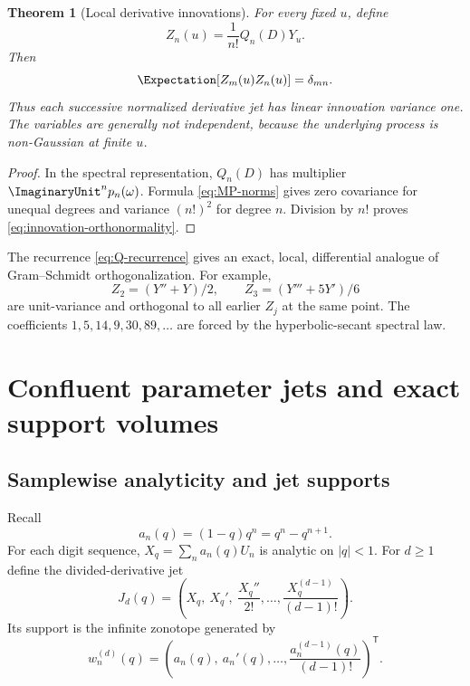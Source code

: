 \documentclass[11pt,a4paper]{article}
\newtheorem{theorem}{Theorem}[section]
\theoremstyle{definition}
\theoremstyle{remark}
\begin{document}
\begin{theorem}[Local derivative innovations]
\label{thm:derivative-innovations}
For every fixed $u$, define
\begin{equation}
  Z_n(u)=\frac1{n!}Q_n(D)Y_u.
  \label{eq:Zn}
\end{equation}
Then
\begin{equation}
  \Expectation[Z_m(u)Z_n(u)]=\delta_{mn}.
  \label{eq:innovation-orthonormality}
\end{equation}
Thus each successive normalized derivative jet has linear innovation variance one.  The variables are generally not independent, because the underlying process is non-Gaussian at finite $u$.
\end{theorem}

\begin{proof}
In the spectral representation, $Q_n(D)$ has multiplier $\ImaginaryUnit^np_n(\omega)$.  Formula \eqref{eq:MP-norms} gives zero covariance for unequal degrees and variance $(n!)^2$ for degree $n$.  Division by $n!$ proves \eqref{eq:innovation-orthonormality}.
\end{proof}

\begin{provedbox}
The recurrence \eqref{eq:Q-recurrence} gives an exact, local, differential analogue of Gram--Schmidt orthogonalization.  For example,
\[
 Z_2=(Y''+Y)/2,
 \qquad
 Z_3=(Y'''+5Y')/6
\]
are unit-variance and orthogonal to all earlier $Z_j$ at the same point.  The coefficients $1,5,14,9,30,89,\ldots$ are forced by the hyperbolic-secant spectral law.
\end{provedbox}

\section{Confluent parameter jets and exact support volumes}
\label{sec:jets}

\subsection{Samplewise analyticity and jet supports}

Recall
\begin{equation}
  a_n(q)=(1-q)q^n=q^n-q^{n+1}.
  \label{eq:anq}
\end{equation}
For each digit sequence, $X_q=\sum_na_n(q)U_n$ is analytic on $|q|<1$.  For $d\ge1$ define the divided-derivative jet
\begin{equation}
  J_d(q)=\left(
   X_q,\ X_q',\ \frac{X_q''}{2!},\ldots,
   \frac{X_q^{(d-1)}}{(d-1)!}
  \right).
  \label{eq:Jd}
\end{equation}
Its support is the infinite zonotope generated by
\begin{equation}
  w_n^{(d)}(q)=\left(
    a_n(q),\ a_n'(q),\ldots,
    \frac{a_n^{(d-1)}(q)}{(d-1)!}
  \right)^\mathsf{T}.
  \label{eq:jet-generators}
\end{equation}
\end{document}
